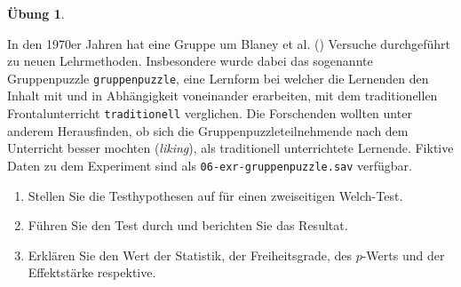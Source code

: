\documentclass[
]{book}
\providecommand{\tightlist}{%
  \setlength{\itemsep}{0pt}\setlength{\parskip}{0pt}}
\theoremstyle{definition}
\theoremstyle{definition}
\theoremstyle{definition}
\newtheorem{exercise}{Übung}[chapter]
\theoremstyle{definition}
\theoremstyle{remark}
\begin{document}
\begin{exercise}
\protect\hypertarget{exr:gruppenpuzzle}{}\label{exr:gruppenpuzzle}\leavevmode

In den 1970er Jahren hat eine Gruppe um Blaney et al. () Versuche durchgeführt zu neuen Lehrmethoden. Insbesondere wurde dabei das sogenannte Gruppenpuzzle \texttt{gruppenpuzzle}, eine Lernform bei welcher die Lernenden den Inhalt mit und in Abhängigkeit voneinander erarbeiten, mit dem traditionellen Frontalunterricht \texttt{traditionell} verglichen. Die Forschenden wollten unter anderem Herausfinden, ob sich die Gruppenpuzzleteilnehmende nach dem Unterricht besser mochten (\emph{liking}), als traditionell unterrichtete Lernende. Fiktive Daten zu dem Experiment sind als \texttt{06-exr-gruppenpuzzle.sav} verfügbar.

\begin{enumerate}
\def\labelenumi{\alph{enumi})}
\tightlist
\item
  Stellen Sie die Testhypothesen auf für einen zweiseitigen Welch-Test.
\item
  Führen Sie den Test durch und berichten Sie das Resultat.
\item
  Erklären Sie den Wert der Statistik, der Freiheitsgrade, des \(p\)-Werts und der Effektstärke respektive.
\end{enumerate}

\end{exercise}
\end{document}
